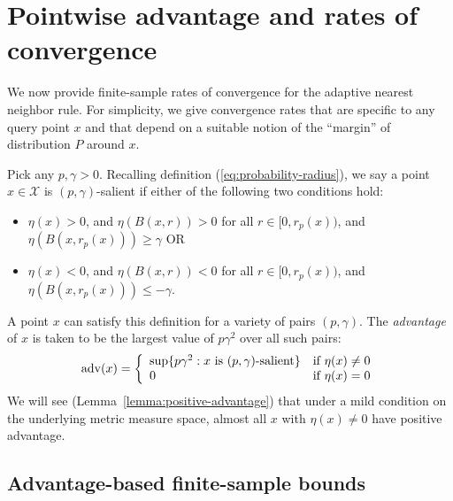 \documentclass{article}
\def\X{{\mathcal X}}
\def\adv{{\rm adv}}
\begin{document}
\section{Pointwise advantage and rates of convergence}

We now provide finite-sample rates of convergence for the adaptive nearest neighbor rule. For simplicity, we give convergence rates that are specific to any query point $x$ and that depend on a suitable notion of the ``margin'' of distribution $P$ around $x$.

Pick any $p, \gamma > 0$. Recalling definition (\ref{eq:probability-radius}), we say a point $x \in \X$ is $(p, \gamma)$-salient if either of the following two conditions hold:
\begin{itemize}
\item $\eta(x) > 0$, and $\eta(B(x,r)) > 0$ for all $r \in [0,r_p(x))$, and $\eta(B(x,r_p(x))) \geq \gamma$ \qquad OR
\item $\eta(x) < 0$, and $\eta(B(x,r)) < 0$ for all $r \in [0,r_p(x))$, and $\eta(B(x,r_p(x))) \leq -\gamma$.
\end{itemize}
A point $x$ can satisfy this definition for a variety of pairs $(p,\gamma)$. The {\it advantage} of $x$ is taken to be the largest value of $p\gamma^2$ over all such pairs:
\begin{equation}
\adv(x) = 
\left\{
\begin{array}{ll}
\sup \{ p \gamma^2: \mbox{$x$ is $(p,\gamma)$-salient}\} & \mbox{if $\eta(x) \neq 0$} \\
0 & \mbox{if $\eta(x) = 0$}
\end{array}
\right.
\label{eq:advantage}
\end{equation}
We will see (Lemma~\ref{lemma:positive-advantage}) that under a mild condition on the underlying metric measure space, almost all $x$ with $\eta(x) \neq 0$ have positive advantage.

\subsection{Advantage-based finite-sample bounds}
\end{document}

